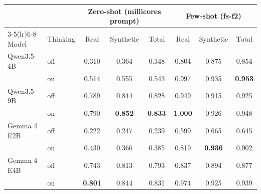 \begin{tabular}{llcccccc}
\toprule
 & & \multicolumn{3}{c}{Zero-shot (millicores prompt)} & \multicolumn{3}{c}{Few-shot (fs-f2)} \\
\cmidrule(lr){3-5}\cmidrule(lr){6-8}
Model & Thinking & Real & Synthetic & Total & Real & Synthetic & Total \\
\midrule
Qwen3.5-4B & off & 0.310 & 0.364 & 0.348 & 0.804 & 0.875 & 0.854 \\
 & on & 0.514 & 0.555 & 0.543 & 0.997 & 0.935 & \textbf{0.953} \\
\midrule
Qwen3.5-9B & off & 0.789 & 0.844 & 0.828 & 0.949 & 0.915 & 0.925 \\
 & on & 0.790 & \textbf{0.852} & \textbf{0.833} & \textbf{1.000} & 0.926 & 0.948 \\
\midrule
Gemma 4 E2B & off & 0.222 & 0.247 & 0.239 & 0.599 & 0.665 & 0.645 \\
 & on & 0.430 & 0.366 & 0.385 & 0.819 & \textbf{0.936} & 0.902 \\
\midrule
Gemma 4 E4B & off & 0.743 & 0.813 & 0.793 & 0.837 & 0.894 & 0.877 \\
 & on & \textbf{0.801} & 0.844 & 0.831 & 0.974 & 0.925 & 0.939 \\
\bottomrule
\end{tabular}
